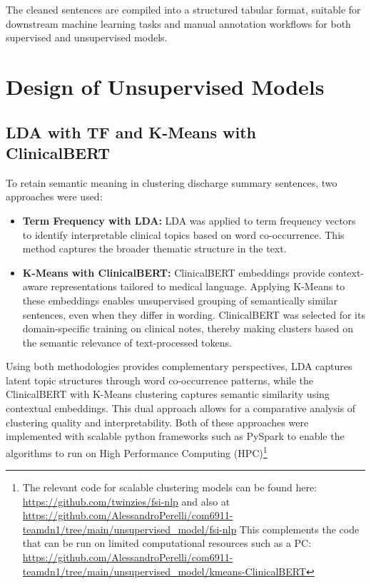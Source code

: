 The cleaned sentences are compiled into a structured tabular format, suitable for downstream machine learning tasks and manual annotation workflows for both supervised and unsupervised models.

 
\section{Design of Unsupervised Models}

\subsection{LDA with TF and K-Means with ClinicalBERT}

To retain semantic meaning in clustering discharge summary sentences, two approaches were used:

\begin{itemize}
    \item \textbf{Term Frequency with LDA:} LDA was applied to term frequency vectors to identify interpretable clinical topics based on word co-occurrence. This method captures the broader thematic structure in the text.
    
    \item \textbf{K-Means with ClinicalBERT:} ClinicalBERT embeddings provide context-aware representations tailored to medical language. Applying K-Means to these embeddings enables unsupervised grouping of semantically similar sentences, even when they differ in wording. ClinicalBERT was selected for its domain-specific training on clinical notes, thereby making clusters based on the semantic relevance of text-processed tokens.
\end{itemize}

Using both methodologies provides complementary perspectives, LDA captures latent topic structures through word co-occurrence patterns, while the ClinicalBERT with K-Means clustering captures semantic similarity using contextual embeddings. This dual approach allows for a comparative analysis of clustering quality and interpretability. Both of these approaches were implemented with scalable python frameworks such as PySpark to enable the algorithms to run on High Performance Computing (HPC)\footnote{The relevant code for scalable clustering models can be found here: \url{https://github.com/twinzies/fsi-nlp} and also at \url{https://github.com/AlessandroPerelli/com6911-teamdn1/tree/main/unsupervised_model/fsi-nlp} This complements the code that can be run on limited computational resources such as a PC: \url{https://github.com/AlessandroPerelli/com6911-teamdn1/tree/main/unsupervised_model/kmeans-ClinicalBERT}} \medskip


